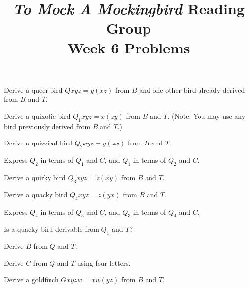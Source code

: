 \documentclass[12pt, letterpaper]{article}
\title{\emph{To Mock A Mockingbird} Reading Group\\Week 6 Problems}
\begin{document}
\maketitle

\disclaimer

\begin{prob}{11.37}  
Derive a queer bird $Qxyz = y(xz)$ from $B$ and one other bird already derived from $B$ and $T$.
\end{prob}

\begin{prob}{11.38}  
Derive a quixotic bird $Q_1xyz = x(zy)$ from $B$ and $T$. (Note: You may use any bird previously derived from $B$ and $T$.)
\end{prob}

\begin{prob}{11.39}  
Derive a quizzical bird $Q_2xyz = y(zx)$ from $B$ and $T$.
\end{prob}

\begin{prob}{11.40}  
Express $Q_2$ in terms of $Q_1$ and $C$, and $Q_1$ in terms of $Q_2$ and $C$.
\end{prob}

\begin{prob}{11.41}  
Derive a quirky bird $Q_3xyz = z(xy)$ from $B$ and $T$.
\end{prob}

\begin{prob}{11.42}  
Derive a quacky bird $Q_4xyz = z(yx)$ from $B$ and $T$.
\end{prob}

\begin{prob}{11.43}  
Express $Q_4$ in terms of $Q_3$ and $C$, and $Q_3$ in terms of $Q_4$ and $C$.
\end{prob}

\begin{prob}{11.44}  
Is a quacky bird derivable from $Q_1$ and $T$?
\end{prob}

\begin{prob}{11.45}  
Derive $B$ from $Q$ and $T$.
\end{prob}

\begin{prob}{11.46}  
Derive $C$ from $Q$ and $T$ using four letters.
\end{prob}

\begin{prob}{11.47}  
Derive a goldfinch $Gxyzw = xw(yz)$ from $B$ and $T$.
\end{prob}
\end{document}
